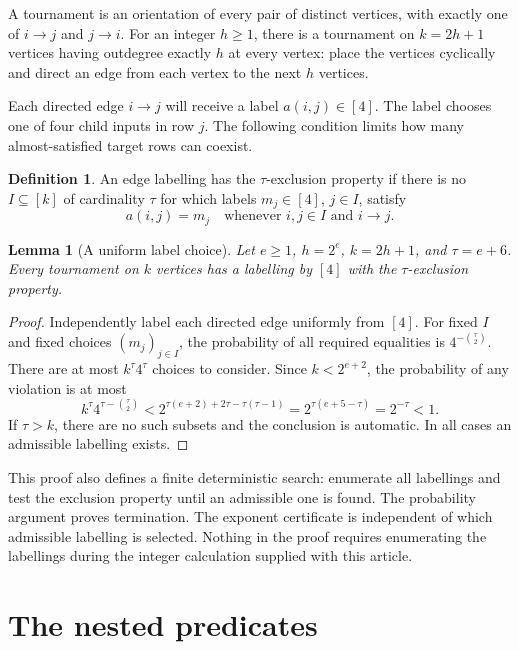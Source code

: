 \documentclass[11pt]{article}
\newtheorem{lemma}[theorem]{Lemma}
\theoremstyle{definition}
\newtheorem{definition}[theorem]{Definition}
\theoremstyle{remark}
\begin{document}
A tournament is an orientation of every pair of distinct vertices, with
exactly one of $i\to j$ and $j\to i$.  For an integer $h\ge1$, there
is a tournament on $k=2h+1$ vertices having outdegree exactly $h$ at every
vertex: place the vertices cyclically and direct an edge from each vertex
to the next $h$ vertices.

Each directed edge $i\to j$ will receive a label $a(i,j)\in[4]$.
The label chooses one of four child inputs in row $j$.  The following
condition limits how many almost-satisfied target rows can coexist.

\begin{definition}
An edge labelling has the $\tau$-exclusion property if there is no
$I\subseteq[k]$ of cardinality $\tau$ for which labels
$m_j\in[4]$, $j\in I$, satisfy
\[
                   a(i,j)=m_j
          \quad\text{whenever }i,j\in I\text{ and }i\to j.
\]
\end{definition}

\begin{lemma}[A uniform label choice]
\label{lem:labels}
Let $e\ge1$, $h=2^e$, $k=2h+1$, and $\tau=e+6$.  Every tournament
on $k$ vertices has a labelling by $[4]$ with the $\tau$-exclusion
property.
\end{lemma}

\begin{proof}
Independently label each directed edge uniformly from $[4]$.  For fixed
$I$ and fixed choices $(m_j)_{j\in I}$, the probability of all required
equalities is $4^{-\binom{\tau}{2}}$.  There are at most
$k^\tau4^\tau$ choices to consider.  Since $k<2^{e+2}$, the probability
of any violation is at most
\[
 k^\tau4^{\tau-\binom{\tau}{2}}
 <2^{\tau(e+2)+2\tau-\tau(\tau-1)}
 =2^{\tau(e+5-\tau)}=2^{-\tau}<1.
\]
If $\tau>k$, there are no such subsets and the conclusion is automatic.
In all cases an admissible labelling exists.
\end{proof}

This proof also defines a finite deterministic search: enumerate all
labellings and test the exclusion property until an admissible one is
found.  The probability argument proves termination.  The exponent
certificate is independent of which admissible labelling is selected.
Nothing in the proof requires enumerating the labellings during the
integer calculation supplied with this article.

\section{The nested predicates}
\label{sec:construction}
\end{document}
